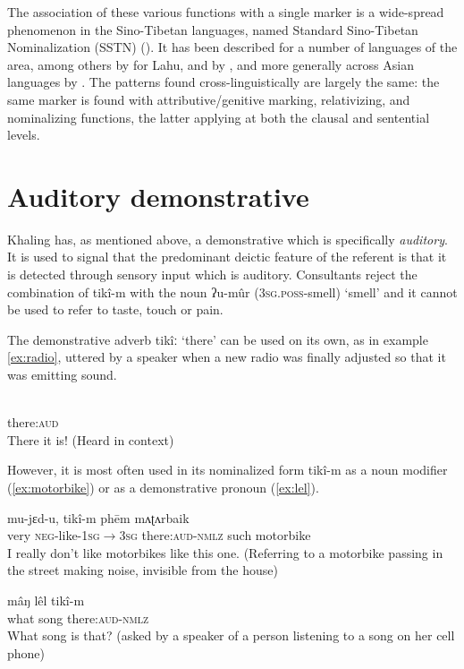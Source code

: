 \documentclass[oldfontcommands,oneside,a4paper,11pt]{article}
\newcommand{\ipa}[1]{{\phon \mbox{#1}}} %
\begin{document}
The association of these various functions with a single marker is a wide-spread phenomenon in the Sino-Tibetan languages, named Standard Sino-Tibetan Nominalization (SSTN) (\citealt{bickel99nmlz}).  It has been described for a number of languages of the area, among others by \citet{matisoff72nmlz} for Lahu,   %
and by \citet{genetti08nmlz}, and more generally across Asian languages by \citet{yap11nmlz}.  The patterns found cross-linguistically are largely the same: the same marker is found with attributive/genitive marking, relativizing, and nominalizing functions, the latter applying at both the clausal and sentential levels.  
\section{Auditory demonstrative}
Khaling has, as mentioned above, a demonstrative which is specifically \textit{auditory}. It is used to signal that the predominant deictic feature of the referent is that it is detected through sensory input which is auditory.  Consultants reject the combination of \ipa{tikî-m} with the noun \ipa{ʔu-mûr} (\textsc{3sg.poss}-smell) `smell' and it cannot be used to refer to taste, touch or pain.
 
 

The demonstrative adverb \ipa{tikîː} `there' can be used on its own, as in example \ref{ex:radio}, uttered by a speaker when a new radio was finally adjusted so that it was emitting sound.

\begin{exe}
\ex \label{ex:radio}
\gll \ipa{tikîː}    \\
  there:\textsc{aud}    \\
\glt There it is!  (Heard in context)
\end{exe}

However, it is most often used in its nominalized form \ipa{tikî-m} as a noun modifier  (\ref{ex:motorbike}) or as a demonstrative pronoun  (\ref{ex:lel}).

\begin{exe}
\ex \label{ex:motorbike}
\gll  	\ipa{mʌri} \ipa{mu-jɛd-u}, 	\ipa{tikî-m}  \ipa{phēm} \ipa{mʌʈʌrbaik}	  \\
very \textsc{neg}-like-\textsc{1sg$\rightarrow$3sg} there:\textsc{aud}-\textsc{nmlz} such motorbike\\
\glt I really don't like motorbikes like this one. (Referring to a motorbike passing in the street making noise, invisible from the house)
\end{exe}
 \begin{exe}
\ex \label{ex:lel}
\gll
\ipa{mâŋ}  	\ipa{lêl}  	\ipa{tikî-m}  \\
what song there:\textsc{aud}-\textsc{nmlz}\\
\glt What song is that? (asked by a speaker of a person listening to a song on her cell phone)
\end{exe}
\end{document}
